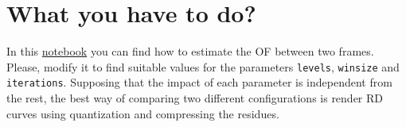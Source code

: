 \begin{comment}
The OF~\cite{horn1981determining} tries to establish connections between the pixels of
the frames $P$ and $R$ supposing that:
\begin{enumerate}
\item $P$ and $R$ are adjacent in time (if $R$ was taken at time $t$,
  $P$ is taken at time $dt+t$) and therefore, similar in
  content.
\item Similarity between images implies that the pixels in both
  frames, $R$ and $P$, will have the same luminance. If $I(x,y,t)$
  measures the luminance of the pixel $(x,y)$ of the frame $R$,
  similarity can be modeled by
  \begin{equation}
    I(x+dx, y+dy, t+dt) = I(x,y,t),
    \label{eq:similarity}
  \end{equation}
  where $I(x+dx, y+dy, t+dt)$ is the corresponding pixel in the frame
  $P$. The first part of the Eq.~\ref{eq:similarity} can be also
  computed by (using the first-order Taylor expansion) as
  \begin{equation}
    I(x+dx, y+dy, t+dt) = I(x,y,t) + \frac{\partial I}{\partial x}dx + \frac{\partial I}{\partial y}dy + \frac{\partial I}{\partial t}dt,
    \label{eq:taylor_exp}
  \end{equation}
  andtherefore, it must be true that
  \begin{equation}
    \frac{\partial I}{\partial x}dx + \frac{\partial I}{\partial y}dy + \frac{\partial I}{\partial t}dt = 0.
    \label{eq:constraint}
  \end{equation}
  Dividing by $dt$, we finally get that
  \begin{equation}
    \frac{\partial I}{\partial x}\frac{dx}{dt} + \frac{\partial I}{\partial y}\frac{dy}{dt} + \frac{\partial I}{\partial t} = 0.
  \end{equation}
\item Adjacent pixels follow parallel
  trajectories~\cite{horn1981determining}, with basically means that
  neighbor pixels will have similar motion.
\end{enumerate}
\end{comment}

\section{What you have to do?}

In this
\href{https://github.com/Sistemas-Multimedia/Sistemas-Multimedia.github.io/blob/master/milestones/10-ME/optical_flow.ipynb}{notebook}
you can find how to estimate the OF between two frames. Please, modify
it to find suitable values for the parameters \texttt{levels},
\texttt{winsize} and \texttt{iterations}. Supposing that the impact of
each parameter is independent from the rest, the best way of comparing
two different configurations is render RD curves using quantization
and compressing the residues.

